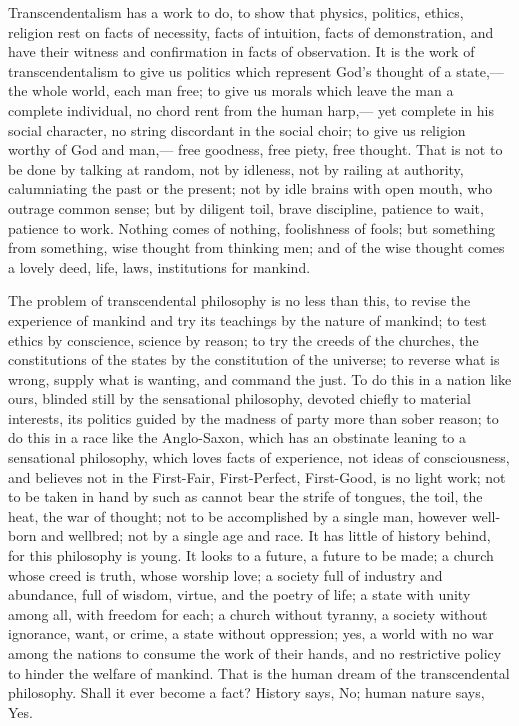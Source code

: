 \documentclass[12pt]{article}
\begin{document}

Transcendentalism has a work to do, to show that physics, politics, ethics, religion rest on facts of necessity, facts of intuition, facts of demonstration, and have their witness and confirmation in facts of observation. It is the work of transcendentalism to give us politics which represent God's thought of a state,--- the whole world, each man free; to give us morals which leave the man a complete individual, no chord rent from the human harp,--- yet complete in his social character, no string discordant in the social choir; to give us religion worthy of God and man,--- free goodness, free piety, free thought. That is not to be done by talking at random, not by idleness, not by railing at authority, calumniating the past or the present; not by idle brains with open mouth, who outrage common sense; but by diligent toil, brave discipline, patience to wait, patience to work. Nothing comes of nothing, foolishness of fools; but something from something, wise thought from thinking men; and of the wise thought comes a lovely deed, life, laws, institutions for mankind. 

The problem of transcendental philosophy is no less than this, to revise the experience of mankind and try its teachings by the nature of mankind; to test ethics by conscience, science by reason; to try the creeds of the churches, the constitutions of the states by the constitution of the universe; to reverse what is wrong, supply what is wanting, and command the just. To do this in a nation like ours, blinded still by the sensational philosophy, devoted chiefly to material interests, its politics guided by the madness of party more than sober reason; to do this in a race like the Anglo-Saxon, which has an obstinate leaning to a sensational philosophy, which loves facts of experience, not ideas of consciousness, and believes not in the First-Fair, First-Perfect, First-Good, is no light work; not to be taken in hand by such as cannot bear the strife of tongues, the toil, the heat, the war of thought; not to be accomplished by a single man, however well-born and wellbred; not by a single age and race. It has little of history behind, for this philosophy is young. It looks to a future, a future to be made; a church whose creed is truth, whose worship love; a society full of industry and abundance, full of wisdom, virtue, and the poetry of life; a state with unity among all, with freedom for each; a church without tyranny, a society without ignorance, want, or crime, a state without oppression; yes, a world with no war among the nations to consume the work of their hands, and no restrictive policy to hinder the welfare of mankind. That is the human dream of the transcendental philosophy. Shall it ever become a fact? History says, No; human nature says, Yes. 
\end{document}
